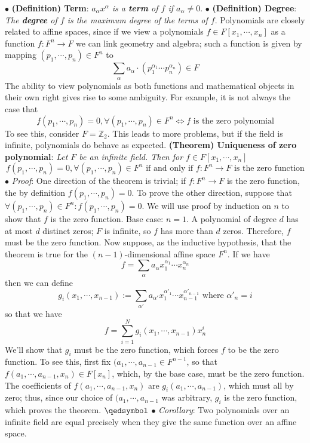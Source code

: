 \documentclass{article}
\begin{document}
\indent $ \bullet $ \textbf{(Definition) Term}: \textit{$ a_{\alpha} x^{\alpha} $ is a \textbf{term} of $ f $ if $ a_{\alpha} \neq 0 $}.
\newline
\indent $ \bullet $ \textbf{(Definition) Degree}: \textit{The \textbf{degree} of $ f $ is the maximum degree of the terms of $ f $}.
\newline \newline
Polynomials are closely related to affine spaces, since if we view a polynomials $ f \in F[x_1, \cdots, x_n] $ as a function $ f: F^n \rightarrow F $ we can link geometry and algebra; such a function is given by mapping $ (p_1, \cdots, p_n) \in F^n $ to
$$ \sum_{\alpha} a_{\alpha} \cdot (p_1^{\alpha_1} \cdots p_n^{\alpha_n}) \in F $$
The ability to view polynomials as both functions and mathematical objects in their own right gives rise to some ambiguity. For example, it is not always the case that 
$$ f(p_1, \cdots, p_n) = 0, \forall (p_1, \cdots, p_n) \in F^n \iff f \text{ is the zero polynomial} $$
To see this, consider $ F = \mathbb{Z}_2 $. This leads to more problems, but if the field is infinite, polynomials do behave as expected.
\newline \newline
\textbf{(Theorem) Uniqueness of zero polynomial}: \textit{Let $ F $ be an infinite field. Then for $ f \in F[x_1, \cdots, x_n] $}
$$ f(p_1, \cdots, p_n) = 0, \forall (p_1, \cdots, p_n) \in F^n \text{ if and only if } f: F^n \rightarrow F \text{ is the zero function} $$
\indent $ \bullet $ \textit{Proof}: One direction of the theorem is trivial; if $ f: F^n \rightarrow F $ is the zero function, the by definition $ f(p_1, \cdots, p_n) = 0 $. To prove the other direction, suppose that $ \forall (p_1, \cdots, p_n) \in F^n: f(p_1, \cdots, p_n) = 0 $. We will use proof by induction on $ n $ to show that $ f $ is the zero function.
\newline
Base case: $ n = 1 $. A polynomial of degree $ d $ has at most $ d $ distinct zeros; $ F $ is infinite, so $ f $ has more than $ d $ zeros. Therefore, $ f $ must be the zero function.
\newline
Now suppose, as the inductive hypothesis, that the theorem is true for the $ (n - 1) $-dimensional affine space $ F^n $. If we have
$$ f = \sum_{\alpha} a_{\alpha} x_1^{\alpha_1} \cdots x_n^{\alpha_n} $$
then we can define 
$$ g_i(x_1, \cdots, x_{n - 1}) := \sum_{\alpha'} a_{\alpha'} x_1^{\alpha'_1} \cdots x_{n - 1}^{\alpha'_{n - 1}} \text{ where } \alpha'_n = i $$
so that we have
$$ f = \sum_{i = 1}^{N} g_i(x_1, \cdots, x_{n - 1}) x_n^i $$
We'll show that $ g_i $ must be the zero function, which forces $ f $ to be the zero function. To see this, first fix $ (a_1, \cdots, a_{n - 1} \in F^{n - 1} $, so that $ f(a_1, \cdots, a_{n - 1}, x_n) \in F[x_n] $, which, by the base case, must be the zero function. The coefficients of $ f(a_1, \cdots, a_{n - 1}, x_n) $ are $ g_i(a_1, \cdots, a_{n - 1}) $, which must all by zero; thus, since our choice of $ (a_1, \cdots, a_{n - 1} $ was arbitrary, $ g_i $ is the zero function, which proves the theorem. $ \qedsymbol $
\indent $ \bullet $ \textit{Corollary}: Two polynomials over an infinite field are equal precisely when they give the same function over an affine space.
\end{document}
